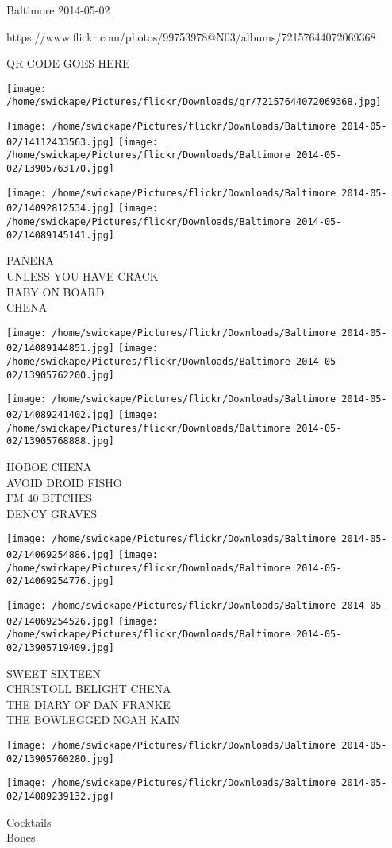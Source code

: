 \documentclass[10pt,letterpaper]{article}
\begin{document}
Baltimore 2014-05-02

https://www.flickr.com/photos/99753978@N03/albums/72157644072069368

QR CODE GOES HERE

\texttt{[image: /home/swickape/Pictures/flickr/Downloads/qr/72157644072069368.jpg]}
\pagebreak

\texttt{[image: /home/swickape/Pictures/flickr/Downloads/Baltimore 2014-05-02/14112433563.jpg]}
\texttt{[image: /home/swickape/Pictures/flickr/Downloads/Baltimore 2014-05-02/13905763170.jpg]}

\texttt{[image: /home/swickape/Pictures/flickr/Downloads/Baltimore 2014-05-02/14092812534.jpg]}
\texttt{[image: /home/swickape/Pictures/flickr/Downloads/Baltimore 2014-05-02/14089145141.jpg]}

PANERA\\
UNLESS YOU HAVE CRACK\\
BABY ON BOARD\\
CHENA\\
\pagebreak

\texttt{[image: /home/swickape/Pictures/flickr/Downloads/Baltimore 2014-05-02/14089144851.jpg]}
\texttt{[image: /home/swickape/Pictures/flickr/Downloads/Baltimore 2014-05-02/13905762200.jpg]}

\texttt{[image: /home/swickape/Pictures/flickr/Downloads/Baltimore 2014-05-02/14089241402.jpg]}
\texttt{[image: /home/swickape/Pictures/flickr/Downloads/Baltimore 2014-05-02/13905768888.jpg]}

HOBOE CHENA\\
AVOID DROID FISHO\\
I'M 40 BITCHES\\
DENCY GRAVES\\
\pagebreak

\texttt{[image: /home/swickape/Pictures/flickr/Downloads/Baltimore 2014-05-02/14069254886.jpg]}
\texttt{[image: /home/swickape/Pictures/flickr/Downloads/Baltimore 2014-05-02/14069254776.jpg]}

\texttt{[image: /home/swickape/Pictures/flickr/Downloads/Baltimore 2014-05-02/14069254526.jpg]}
\texttt{[image: /home/swickape/Pictures/flickr/Downloads/Baltimore 2014-05-02/13905719409.jpg]}

SWEET SIXTEEN\\
CHRISTOLL BELIGHT CHENA\\
THE DIARY OF DAN FRANKE\\
THE BOWLEGGED NOAH KAIN\\
\pagebreak

\texttt{[image: /home/swickape/Pictures/flickr/Downloads/Baltimore 2014-05-02/13905760280.jpg]}

\vspace{0.25in}
\texttt{[image: /home/swickape/Pictures/flickr/Downloads/Baltimore 2014-05-02/14089239132.jpg]}

Cocktails\\
Bones\\
\pagebreak
\end{document}

